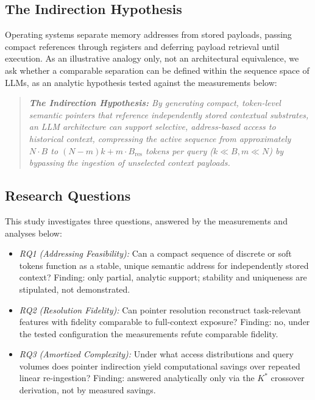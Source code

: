 \documentclass[conference]{IEEEtran}
\begin{document}
\subsection{The Indirection Hypothesis}
Operating systems separate memory addresses from stored payloads, passing compact references through registers and deferring payload retrieval until execution. As an illustrative analogy only, not an architectural equivalence, we ask whether a comparable separation can be defined within the sequence space of LLMs, as an analytic hypothesis tested against the measurements below:
\begin{quote}\itshape\small
\textbf{The Indirection Hypothesis:} By generating compact, token-level semantic pointers that reference independently stored contextual substrates, an LLM architecture can support selective, address-based access to historical context, compressing the active sequence from approximately $N \cdot B$ to $(N-m)k + m \cdot B_{\mathrm{res}}$ tokens per query ($k \ll B, m \ll N$) by bypassing the ingestion of unselected context payloads.
\end{quote}

\subsection{Research Questions}
This study investigates three questions, answered by the measurements and analyses below:
\begin{itemize}\setlength{\itemsep}{0.5pt}\setlength{\parsep}{0pt}\setlength{\parskip}{0pt}\setlength{\topsep}{1.5pt}
    \item \textit{RQ1 (Addressing Feasibility):} Can a compact sequence of discrete or soft tokens function as a stable, unique semantic address for independently stored context? Finding: only partial, analytic support; stability and uniqueness are stipulated, not demonstrated.
    \item \textit{RQ2 (Resolution Fidelity):} Can pointer resolution reconstruct task-relevant features with fidelity comparable to full-context exposure? Finding: no, under the tested configuration the measurements refute comparable fidelity.
    \item \textit{RQ3 (Amortized Complexity):} Under what access distributions and query volumes does pointer indirection yield computational savings over repeated linear re-ingestion? Finding: answered analytically only via the $K^*$ crossover derivation, not by measured savings.
\end{itemize}
\end{document}

